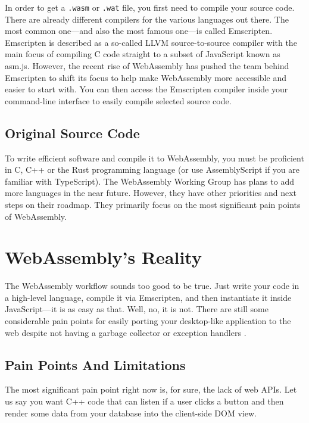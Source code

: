 \documentclass[10pt]{article}
\begin{document}
\begin{sloppypar}
  In order to get a \lstinline{.wasm} or \lstinline{.wat} file, you first need to compile your source code. There are already different compilers for the various languages out there. The most common one—and also the most famous one—is called Emscripten. Emscripten is described as a so-called LLVM source-to-source compiler with the main focus of compiling C code straight to a subset of JavaScript known as asm.js. However, the recent rise of WebAssembly has pushed the team behind Emscripten to shift its focus to help make WebAssembly more accessible and easier to start with. You can then access the Emscripten compiler inside your command-line interface to easily compile selected source code.

  \subsection{Original Source Code}
  \label{sec:original-source-code}

  To write efficient software and compile it to WebAssembly, you must be proficient in C, C++ or the Rust programming language (or use AssemblyScript if you are familiar with TypeScript). The WebAssembly Working Group has plans to add more languages in the near future. However, they have other priorities and next steps on their roadmap. They primarily focus on the most significant pain points of WebAssembly.

  \section{WebAssembly’s Reality}
  \label{sec:webassembly-reality}

  The WebAssembly workflow sounds too good to be true. Just write your code in a high-level language, compile it via Emscripten, and then instantiate it inside JavaScript—it is as easy as that. Well, no, it is not. There are still some considerable pain points for easily porting your desktop-like application to the web despite not having a garbage collector or exception handlers \citep{w3c_roadmap_2019}.

  \subsection{Pain Points And Limitations}
  \label{sec:pain-points-and-limitations}

  The most significant pain point right now is, for sure, the lack of web APIs. Let us say you want C++ code that can listen if a user clicks a button and then render some data from your database into the client-side DOM view.


\end{sloppypar}
\end{document}
